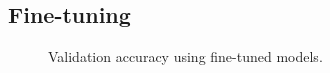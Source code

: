 

\subsection{Fine-tuning} \label{results:ft}

\begin{figure}[tb]
    \centering
    \def\svgwidth{\textwidth}
    
    \caption{Validation accuracy using fine-tuned models.}
    \label{results:img:ft}
\end{figure}

